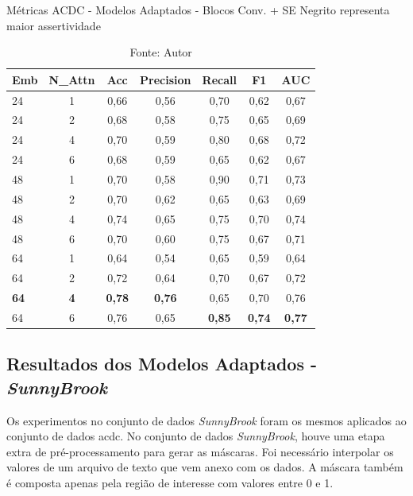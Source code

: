 \begin{table}[htbp]
\centering
\caption{Métricas ACDC - Modelos Adaptados - Blocos Conv. + SE
\newline Negrito representa maior assertividade}
\begin{tabular}{lcccccc}
\toprule
\textbf{Emb} & \textbf{N\_Attn} & \textbf{Acc} & \textbf{Precision} & \textbf{Recall} & \textbf{F1} & \textbf{AUC} \\
\midrule
24 & 1 & 0,66 & 0,56 & 0,70 & 0,62 & 0,67 \\
24 & 2 & 0,68 & 0,58 & 0,75 & 0,65 & 0,69 \\
24 & 4 & 0,70 & 0,59 & 0,80 & 0,68 & 0,72 \\
24 & 6 & 0,68 & 0,59 & 0,65 & 0,62 & 0,67 \\
\hline
48 & 1 & 0,70 & 0,58 & 0,90 & 0,71 & 0,73 \\
48 & 2 & 0,70 & 0,62 & 0,65 & 0,63 & 0,69 \\
48 & 4 & 0,74 & 0,65 & 0,75 & 0,70 & 0,74 \\
48 & 6 & 0,70 & 0,60 & 0,75 & 0,67 & 0,71 \\
\hline
64 & 1 & 0,64 & 0,54 & 0,65 & 0,59 & 0,64 \\
64 & 2 & 0,72 & 0,64 & 0,70 & 0,67 & 0,72 \\
\textbf{64} & \textbf{4} & \textbf{0,78} & \textbf{0,76} & 0,65 & 0,70 & 0,76 \\
64 & 6 & 0,76 & 0,65 & \textbf{0,85} & \textbf{0,74} & \textbf{0,77} \\
\bottomrule
\end{tabular}
\caption*{Fonte: Autor}
\label{tab:metrics_acdc_se}
\end{table}



\subsection{Resultados dos Modelos Adaptados - \textit{SunnyBrook}}
\label{subsec:resultados_sunny_adaptado}

Os experimentos no conjunto de dados \textit{SunnyBrook} foram os mesmos aplicados ao conjunto de dados \gls{acdc}. No conjunto de dados \textit{SunnyBrook}, houve uma etapa extra de pré-processamento para gerar as máscaras. Foi necessário interpolar os valores de um arquivo de texto que vem anexo com os dados. A máscara também é composta apenas pela região de interesse com valores entre 0 e 1.

